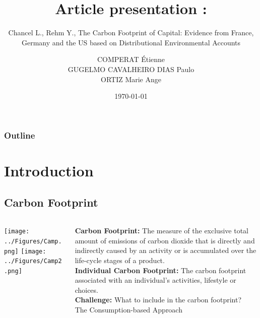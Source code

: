 \documentclass[10pt]{beamer}
\title{Article presentation :}
\subtitle{Chancel L., Rehm Y., The Carbon Footprint of Capital: Evidence from France, Germany and the US based on Distributional Environmental Accounts}
\author{COMPERAT Étienne  \\ GUGELMO CAVALHEIRO DIAS Paulo \\ ORTIZ Marie Ange}
\institute{Sciences Po}
\date{\today}
\newcommand\ReduceFont{\fontsize{10}{7.2}\selectfont}
\begin{document}
\begin{frame}
    \titlepage
\end{frame}

\begin{frame}
    \ReduceFont
    \frametitle{Outline}
    \tableofcontents[hideallsubsections]
\end{frame}

\section{Introduction}
\begin{frame}
    \tableofcontents[currentsection, hideothersubsections, sections=\value{section}]
\end{frame}

\subsection{Carbon Footprint}
\begin{frame}{\subsecname}
    \begin{columns}
        \begin{column}{0.5\textwidth}
            \texttt{[image: ../Figures/Camp.png]}
            \texttt{[image: ../Figures/Camp2.png]}
        \end{column}
        \begin{column}{0.5\textwidth}
            \textbf{Carbon Footprint:} The measure of the exclusive total amount of emissions of carbon dioxide that is directly and indirectly caused by an activity or is accumulated over the life-cycle stages of a product. \\
            \textbf{Individual Carbon Footprint:} The carbon footprint associated with an individual’s activities, lifestyle or choices. \\
            \textbf{Challenge:} What to include in the carbon footprint? \\
            The Consumption-based Approach
        \end{column}
    \end{columns}
\end{frame}
\end{document}
